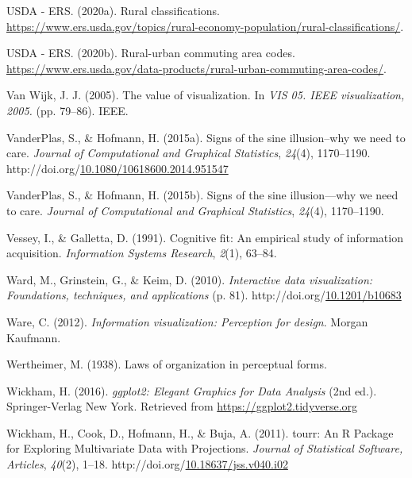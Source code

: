\documentclass[print]{nuthesis}
\newlength{\cslhangindent}
\newenvironment{CSLReferences}[2]%
{\setlength{\parindent}{0pt}%
\everypar{\setlength{\hangindent}{\cslhangindent}}\ignorespaces}%
{\par}
\begin{document}
\begin{CSLReferences}{1}{0}
\leavevmode{}%
USDA - ERS. (2020a). Rural classifications. \url{https://www.ers.usda.gov/topics/rural-economy-population/rural-classifications/}.

\leavevmode{}%
USDA - ERS. (2020b). Rural-urban commuting area codes. \url{https://www.ers.usda.gov/data-products/rural-urban-commuting-area-codes/}.

\leavevmode{}%
Van Wijk, J. J. (2005). The value of visualization. In \emph{VIS 05. IEEE visualization, 2005.} (pp. 79--86). IEEE.

\leavevmode{}%
VanderPlas, S., \& Hofmann, H. (2015a). Signs of the sine illusion--why we need to care. \emph{Journal of Computational and Graphical Statistics}, \emph{24}(4), 1170--1190. http://doi.org/\href{https://doi.org/10.1080/10618600.2014.951547}{10.1080/10618600.2014.951547}

\leavevmode{}%
VanderPlas, S., \& Hofmann, H. (2015b). Signs of the sine illusion---why we need to care. \emph{Journal of Computational and Graphical Statistics}, \emph{24}(4), 1170--1190.

\leavevmode{}%
Vessey, I., \& Galletta, D. (1991). Cognitive fit: An empirical study of information acquisition. \emph{Information Systems Research}, \emph{2}(1), 63--84.

\leavevmode{}%
Ward, M., Grinstein, G., \& Keim, D. (2010). \emph{Interactive data visualization: Foundations, techniques, and applications} (p. 81). http://doi.org/\href{https://doi.org/10.1201/b10683}{10.1201/b10683}

\leavevmode{}%
Ware, C. (2012). \emph{Information visualization: Perception for design}. Morgan Kaufmann.

\leavevmode{}%
Wertheimer, M. (1938). Laws of organization in perceptual forms.

\leavevmode{}%
Wickham, H. (2016). \emph{{ggplot2: Elegant Graphics for Data Analysis}} (2nd ed.). Springer-Verlag New York. Retrieved from \url{https://ggplot2.tidyverse.org}

\leavevmode{}%
Wickham, H., Cook, D., Hofmann, H., \& Buja, A. (2011). {tourr: An R Package for Exploring Multivariate Data with Projections}. \emph{Journal of Statistical Software, Articles}, \emph{40}(2), 1--18. http://doi.org/\href{https://doi.org/10.18637/jss.v040.i02}{10.18637/jss.v040.i02}


\end{CSLReferences}
\end{document}
